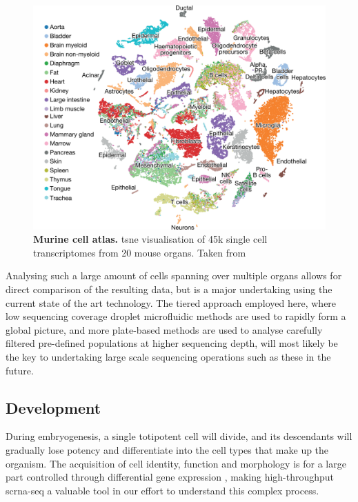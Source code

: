 \begin{figure}[ht]
	\centerfloat
	\includegraphics[width=\textwidth]{./ims/test2018.png}
	\caption[Murine cell atlas]{\textbf{Murine cell atlas.} \acrshort{tsne} visualisation of 45k single cell transcriptomes from 20 mouse organs. Taken from \cite{schaum2019}}
	\label{fig:schaum2019}
\end{figure}

Analysing such a large amount of cells spanning over multiple organs allows for direct comparison of the resulting data, but is a major undertaking using the current state of the art technology. The tiered approach employed here, where low sequencing coverage droplet microfluidic methods are used to rapidly form a global picture, and more plate-based methods are used to analyse carefully filtered pre-defined populations at higher sequencing depth, will most likely be the key to undertaking large scale sequencing operations such as these in the future.\pms

\subsection{Development}
During embryogenesis, a single totipotent cell will divide, and its descendants will gradually lose potency and differentiate into the cell types that make up the organism. The acquisition of cell identity, function and morphology is for a large part controlled through differential gene expression \citep{farrell2018}, making high-throughput \acrshort{scrna-seq} a valuable tool in our effort to understand this complex process.\pms

